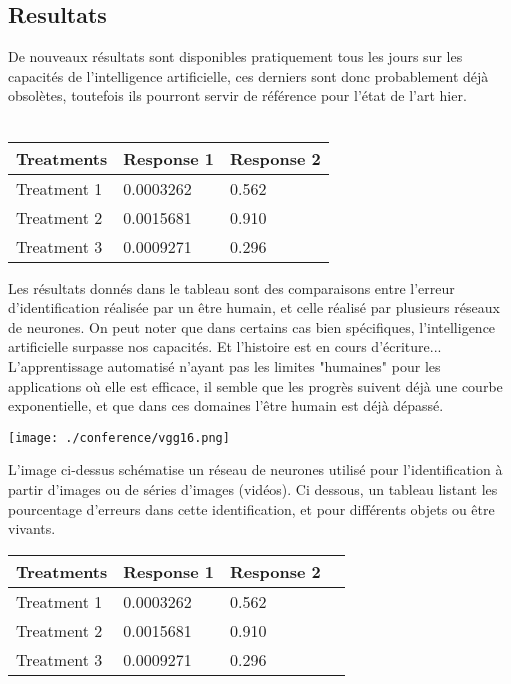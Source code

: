 \documentclass[a0,landscape]{a0poster}
\begin{document}
\begin{multicols}{4}
\section*{Resultats}

De nouveaux résultats sont disponibles pratiquement tous les jours sur les capacités de l'intelligence artificielle, ces derniers sont donc probablement déjà obsolètes, toutefois ils pourront servir de référence pour l'état de l'art hier.
\\
\\
%
\begin{wraptable}{l}{12cm} %
\begin{tabular}{l l l}
\toprule
\textbf{Treatments} & \textbf{Response 1} & \textbf{Response 2}\\
\midrule
Treatment 1 & 0.0003262 & 0.562 \\
Treatment 2 & 0.0015681 & 0.910 \\
Treatment 3 & 0.0009271 & 0.296 \\
\bottomrule
\end{tabular}
\end{wraptable}
%
Les résultats donnés dans le tableau sont des comparaisons entre l'erreur d'identification réalisée par un être humain, et celle réalisé par plusieurs réseaux de neurones. On peut noter que dans certains cas bien spécifiques, l'intelligence artificielle surpasse nos capacités. Et l'histoire est en cours d'écriture... L'apprentissage automatisé n'ayant pas les limites "humaines" pour les applications où elle est efficace, il semble que les progrès suivent déjà une courbe exponentielle, et que dans ces domaines l'être humain est déjà dépassé.
\begin{center}\vspace{1cm}
\texttt{[image: ./conference/vgg16.png]}
\end{center}\vspace{1cm}

L'image ci-dessus schématise un réseau de neurones utilisé pour l'identification à partir d'images ou de séries d'images (vidéos).
Ci dessous, un tableau listant les pourcentage d'erreurs dans cette identification, et pour différents objets ou être vivants.
\begin{center}\vspace{1cm}
\begin{tabular}{l l l l}
\toprule
\textbf{Treatments} & \textbf{Response 1} & \textbf{Response 2} \\
\midrule
Treatment 1 & 0.0003262 & 0.562 \\
Treatment 2 & 0.0015681 & 0.910 \\
Treatment 3 & 0.0009271 & 0.296 \\
\bottomrule
\end{tabular}
\end{center}\vspace{1cm}


\end{multicols}
\end{document}

